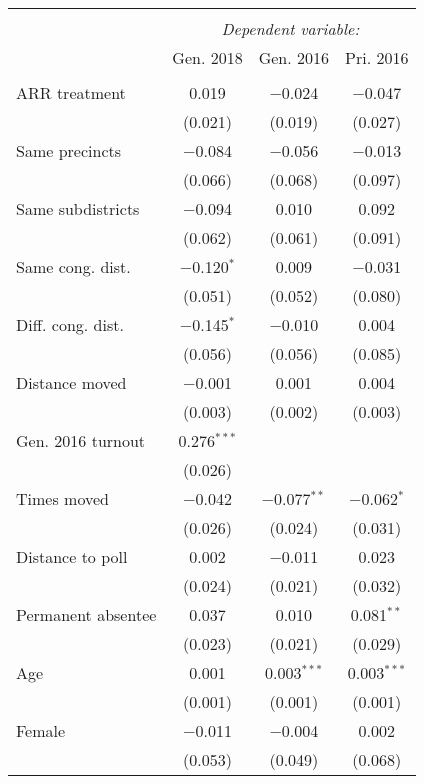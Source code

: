 
\begin{tabular}{@{\extracolsep{5pt}}lccc} 
\\[-1.8ex]\hline 
\hline \\[-1.8ex] 
 & \multicolumn{3}{c}{\textit{Dependent variable:}} \\ 
\cline{2-4} 
 & Gen. 2018 & Gen. 2016 & Pri. 2016 \\ 
\hline \\[-1.8ex] 
 ARR treatment & 0.019 & $-$0.024 & $-$0.047 \\ 
  & (0.021) & (0.019) & (0.027) \\ 
  Same precincts & $-$0.084 & $-$0.056 & $-$0.013 \\ 
  & (0.066) & (0.068) & (0.097) \\ 
  Same subdistricts & $-$0.094 & 0.010 & 0.092 \\ 
  & (0.062) & (0.061) & (0.091) \\ 
  Same cong. dist. & $-$0.120$^{*}$ & 0.009 & $-$0.031 \\ 
  & (0.051) & (0.052) & (0.080) \\ 
  Diff. cong. dist. & $-$0.145$^{*}$ & $-$0.010 & 0.004 \\ 
  & (0.056) & (0.056) & (0.085) \\ 
  Distance moved & $-$0.001 & 0.001 & 0.004 \\ 
  & (0.003) & (0.002) & (0.003) \\ 
  Gen. 2016 turnout & 0.276$^{***}$ &  &  \\ 
  & (0.026) &  &  \\ 
  Times moved & $-$0.042 & $-$0.077$^{**}$ & $-$0.062$^{*}$ \\ 
  & (0.026) & (0.024) & (0.031) \\ 
  Distance to poll & 0.002 & $-$0.011 & 0.023 \\ 
  & (0.024) & (0.021) & (0.032) \\ 
  Permanent absentee & 0.037 & 0.010 & 0.081$^{**}$ \\ 
  & (0.023) & (0.021) & (0.029) \\ 
  Age & 0.001 & 0.003$^{***}$ & 0.003$^{***}$ \\ 
  & (0.001) & (0.001) & (0.001) \\ 
  Female & $-$0.011 & $-$0.004 & 0.002 \\ 
  & (0.053) & (0.049) & (0.068) \\ 

\end{tabular}
